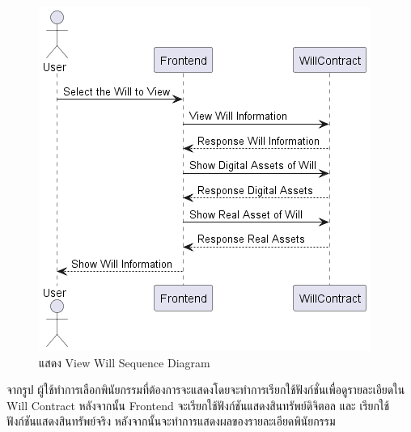 \documentclass[12pt,oneside,openright,a4paper]{cpe-thai-project}
\begin{document}
\begin{enumerate}[label=\thesubsection.\arabic*,leftmargin=0pt,itemindent=1.25cm]
\begin{table}[h]
\begin{tabularx}{\textwidth}{|l|X|X|}
		\hline
	\end{tabularx}
	\end{table}
		\begin{figure}[!thb]
			\centering
			\includegraphics[scale=0.5]{viewWillseq}
			\caption{แสดง View Will Sequence Diagram}
		\end{figure}
		\FloatBarrier
	\tab จากรูป ผู้ใช้ทำการเลือกพินัยกรรมที่ต้องการจะแสดงโดยจะทำการเรียกใช้ฟังก์ชั่นเพื่อดูรายละเอียดใน Will Contract หลังจากนั้น Frontend จะเรียกใช้ฟังก์ชันแสดงสินทรัพย์ดิจิตอล และ เรียกใช้ฟังก์ชันแสดงสินทรัพย์จริง หลังจากนั้นจะทำการแสดงผลของรายละเอียดพินัยกรรม
	

\end{enumerate}
\end{document}
